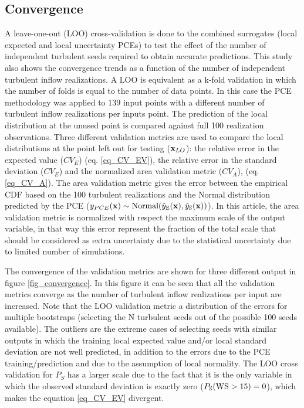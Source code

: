 \documentclass[preprint,12pt]{elsarticle}
\begin{document}
\subsection{Convergence}

A leave-one-out (LOO) cross-validation is done to the combined surrogates (local expected and local uncertainty PCEs) to test the effect of the number of independent turbulent seeds required to obtain accurate predictions. This study also shows the convergence trends as a function of the number of independent turbulent inflow realizations. A LOO is equivalent as a k-fold validation in which the number of folds is equal to the number of data points. In this case the PCE methodology was applied to 139 input points with a different number of turbulent inflow realizations per inputs point. The prediction of the local distribution at the unused point is compared against full 100 realization observations. Three different validation metrics are used to compare the local distributions at the point left out for testing ($\mathbf{x}_{LO}$): the relative error in the expected value ($CV_E$) (eq. \ref{eq_CV_EV}), the relative error in the standard deviation ($CV_E$) and the normalized area validation metric ($CV_A$), (eq. \ref{eq_CV_A}). The area validation metric gives the error between the empirical CDF based on the 100 turbulent realizations and the Normal distribution predicted by the PCE ($y_{PCE}(\mathbf{x}) \sim \text{Normal} (\hat{y}_{\mathbb{E}}(\mathbf{x}),\hat{y}_{\mathbb{S}}(\mathbf{x}))$). In this article, the area validation metric is normalized with respect the maximum scale of the output variable, in that way this error represent the fraction of the total scale that should be considered as extra uncertainty due to the statistical uncertainty due to limited number of simulations.



The convergence of the validation metrics are shown for three different output in figure \ref{fig_convergence}. In this figure it can be seen that all the validation metrics converge as the number of turbulent inflow realizations per input are increased. Note that the LOO validation metric a distribution of the errors for multiple bootstraps (selecting the N turbulent seeds out of the possible 100 seeds available). The outliers are the extreme cases of selecting seeds with similar outputs in which the training local expected value and/or local standard deviation are not well predicted, in addition to the errors due to the PCE training/prediction and due to the assumption of local normality. The LOO cross validation for $P_S$ has a larger scale due to the fact that it is the only variable in which the observed standard deviation is exactly zero ($P_{\mathbb{S}}(\text{WS}>15) = 0$), which makes the equation \ref{eq_CV_EV} divergent.
\end{document}
